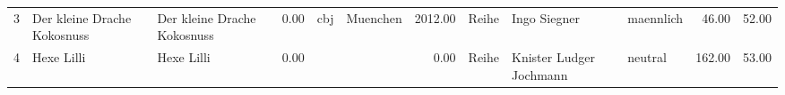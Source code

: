 \begin{table}
\begin{center}
{\begin{tabular}{rllrllrlllrr}
  3 & Der kleine Drache Kokosnuss                                                                                                                                                                                                                                     & Der kleine Drache Kokosnuss                                                                                                                                                                                                                                     & 0.00 & cbj                                                                                                                                                                                                                                                             & Muenchen                                                                                                                                                                                                                                                        & 2012.00 & Reihe & Ingo Siegner                                                                                                                                                                                                                                                    & maennlich & 46.00 & 52.00 \\ 
  4 & Hexe Lilli                                                                                                                                                                                                                                                      & Hexe Lilli                                                                                                                                                                                                                                                      & 0.00 &                                                                                                                                                                                                                                                                 &                                                                                                                                                                                                                                                                 & 0.00 & Reihe & Knister Ludger Jochmann                                                                                                                                                                                                                                         & neutral & 162.00 & 53.00 \\ 

\end{tabular}}
\end{center}
\end{table}
